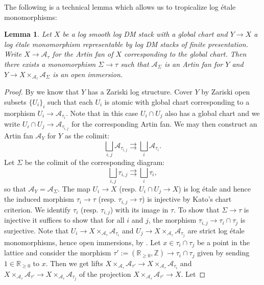 \documentclass[11pt]{amsart}
\newtheorem{lemma}[theorem]{Lemma}
\theoremstyle{definition}
\theoremstyle{remark}
\begin{document}
The following is a technical lemma which allows us to tropicalize log étale monomorphisms:

\begin{lemma}
	Let $X$ be a log smooth log DM stack with a global chart and $Y\to X$ a log étale monomorphism representable
	by log DM stacks of finite presentation. Write $X\to \mathcal{A}_{\tau}$ for the Artin fan of $X$ corresponding to the global chart.
	Then there exists a monomorphism $\Sigma\to \tau$ such that $\mathcal{A}_{\Sigma}$ is an Artin fan for $Y$
	and $Y\to X\times_{\mathcal{A}_{\tau}}\mathcal{A}_{\Sigma}$ is an open immersion.
\end{lemma}

\begin{proof}
	By \cite[Proposition 2.2]{Grothendieck_to_Hu_Xi_2025} we know
	that $Y$ has a Zariski log structure. Cover $Y$ by Zariski open subsets $\{U_i\}_i$ such
	that each $U_i$ is atomic with global chart corresponding to a morphism
	$U_i\to \mathcal{A}_{\tau_i}$. Note that in this case $U_i\cap U_j$ also has a global chart
	and we write $U_i\cap U_j\to \mathcal{A}_{\tau_{i,j}}$ for the corresponding Artin fan.
	We may then construct an Artin fan $\mathcal{A}_Y$ for $Y$ as the colimit:
	$$\bigsqcup_{i,j}\mathcal{A}_{\tau_{i,j}}\rightrightarrows \bigsqcup_{i}\mathcal{A}_{\tau_i}.$$
	Let $\Sigma$ be the colimit of the corresponding diagram:
	$$\bigsqcup_{i,j}\tau_{i,j}\rightrightarrows \bigsqcup_{i}\tau_i,$$
	so that $\mathcal{A}_Y=\mathcal{A}_{\Sigma}$.
	The map $U_i\to X$ (resp. $U_i\cap U_j\to X$) is log étale and hence the induced morphism $\tau_i\to \tau$
	(resp. $\tau_{i,j}\to \tau$) is injective by Kato's chart
	criterion. We identify $\tau_i$ (resp. $\tau_{i,j}$) with its image in $\tau$.
	To show that $\Sigma\to \tau$ is injective it suffices to show that for all $i$ and $j$,
	the morphism $\tau_{i,j}\to \tau_i\cap \tau_j$ is surjective. Note that $U_i\to X\times_{\mathcal{A}_{\tau}}\mathcal{A}_{\tau_i}$
	and $U_j\to X\times_{\mathcal{A}_{\tau}}\mathcal{A}_{\tau_j}$ are strict log étale monomorphisms, hence open immersions,
	by \cite[Tag 025G]{stacks-project}.
	Let $x\in \tau_i\cap \tau_j$ be a point in the lattice and consider the morphism $\tau':=(\mathbb{R}_{\ge 0},\mathbb{Z})\to \tau_i\cap \tau_j$
	given by sending $1\in \mathbb{R}_{\ge 0}$ to $x$. Then we get lifts
	$X\times_{\mathcal{A}_{\tau}}\mathcal{A}_{\tau'}\to X\times_{\mathcal{A}_{\tau}}\mathcal{A}_{\tau_i}$ and
	$X\times_{\mathcal{A}_{\tau}}\mathcal{A}_{\tau'}\to X\times_{\mathcal{A}_{\tau}}\mathcal{A}_{\tau_j}$ of the projection
	$X\times_{\mathcal{A}_{\tau}}\mathcal{A}_{\tau'}\to X$. Let

\end{proof}
\end{document}
